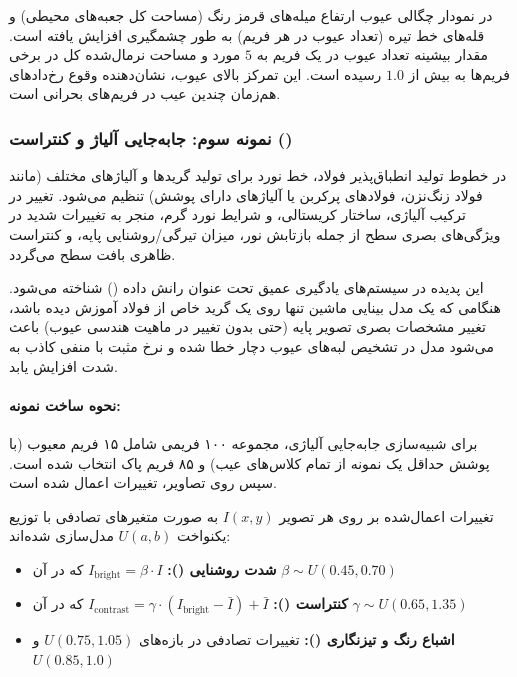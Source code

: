 \documentclass[a4paper, 10pt, twocolumn]{article}
\begin{document}
	در نمودار چگالی عیوب ارتفاع میله‌های قرمز رنگ (مساحت کل جعبه‌های محیطی) و قله‌های خط تیره (تعداد عیوب در هر فریم) به طور چشمگیری افزایش یافته است. مقدار بیشینه تعداد عیوب در یک فریم به $5$ مورد و مساحت نرمال‌شده کل در برخی فریم‌ها به بیش از $1.0$ رسیده است. این تمرکز بالای عیوب، نشان‌دهنده وقوع رخ‌دادهای هم‌زمان چندین عیب در فریم‌های بحرانی است.
	
	\subsubsection*{نمونه سوم: جابه‌جایی آلیاژ و کنتراست ()}
	
	در خطوط تولید انطباق‌پذیر فولاد، خط نورد برای تولید گریدها و آلیاژهای مختلف (مانند فولاد زنگ‌نزن، فولادهای پرکربن یا آلیاژهای دارای پوشش) تنظیم می‌شود. تغییر در ترکیب آلیاژی، ساختار کریستالی، و شرایط نورد گرم، منجر به تغییرات شدید در ویژگی‌های بصری سطح از جمله بازتابش نور، میزان تیرگی/روشنایی پایه، و کنتراست ظاهری بافت سطح می‌گردد.
	
	این پدیده در سیستم‌های یادگیری عمیق تحت عنوان رانش داده () شناخته می‌شود. هنگامی که یک مدل بینایی ماشین تنها روی یک گرید خاص از فولاد آموزش دیده باشد، تغییر مشخصات بصری تصویر پایه (حتی بدون تغییر در ماهیت هندسی عیوب) باعث می‌شود مدل در تشخیص لبه‌های عیوب دچار خطا شده و نرخ مثبت با منفی کاذب به شدت افزایش یابد.
	
	\paragraph{نحوه ساخت نمونه: }
	برای شبیه‌سازی جابه‌جایی آلیاژی، مجموعه ۱۰۰ فریمی شامل ۱۵ فریم معیوب (با پوشش حداقل یک نمونه از تمام کلاس‌های عیب) و ۸۵ فریم پاک انتخاب شده است. سپس روی تصاویر، تغییرات  اعمال شده است.
	
	تغییرات اعمال‌شده بر روی هر تصویر $I(x,y)$ به صورت متغیرهای تصادفی با توزیع یکنواخت $U(a, b)$ مدل‌سازی شده‌اند:
	\begin{itemize}
		\item \textbf{شدت روشنایی ():} 
		$I_{\text{bright}} = \beta \cdot I$ که در آن $\beta \sim U(0.45, 0.70)$
		\item \textbf{کنتراست ():} 
		$I_{\text{contrast}} = \gamma \cdot (I_{\text{bright}} - \bar{I}) + \bar{I}$ که در آن $\gamma \sim U(0.65, 1.35)$
		\item \textbf{اشباع رنگ و تیزنگاری ():}
		تغییرات تصادفی در بازه‌های $U(0.75, 1.05)$ و $U(0.85, 1.0)$
	\end{itemize}
	
\end{document}
